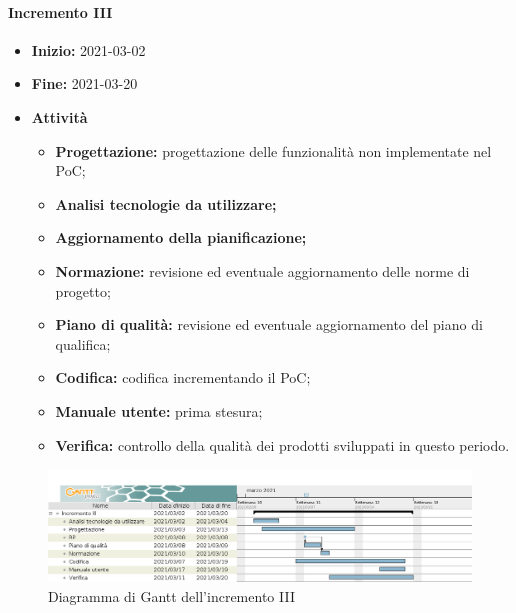 \paragraph[Incremento III]{Incremento III}
\begin{itemize}
    \item [] \textbf{Inizio:} 2021-03-02
    \item [] \textbf{Fine:} 2021-03-20
    \item [] \textbf{Attività}
          \begin{itemize}
              \item \textbf{Progettazione:} progettazione delle funzionalità non implementate nel PoC;
              \item \textbf{Analisi tecnologie da utilizzare;}
              \item \textbf{Aggiornamento della pianificazione;}
              \item \textbf{Normazione:} revisione ed eventuale aggiornamento delle norme di progetto;
              \item \textbf{Piano di qualità:} revisione ed eventuale aggiornamento del piano di qualifica;
              \item \textbf{Codifica:} codifica incrementando il PoC;
              \item \textbf{Manuale utente:} prima stesura;
              \item \textbf{Verifica:} controllo della qualità dei prodotti sviluppati in questo periodo.
          \end{itemize}
\end{itemize}

\begin{figure}[H]
    \centering
    \includegraphics[width=1\linewidth]{res/images/pianificazione/incremento_3.png}
    \caption{Diagramma di Gantt dell'incremento III}
    \label{fig:_Gantt incremento III}
\end{figure}

